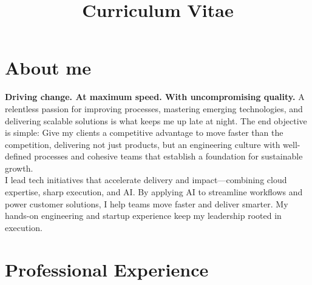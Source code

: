 \documentclass[11pt,a4paper,sans]{moderncv}        %
\title{Curriculum Vitae}                               %
\begin{document}
\makecvtitle

\section{About me}

\textbf{Driving change. At maximum speed. With uncompromising quality.}  A relentless passion for improving processes, mastering emerging technologies, and delivering scalable solutions is what keeps me up late at night. The end objective is simple: Give my clients a competitive advantage to move faster than the competition, delivering not just products, but an engineering culture with well-defined processes and cohesive teams that establish a foundation for sustainable growth. \\

I lead tech initiatives that accelerate delivery and impact—combining cloud expertise, sharp execution, and AI. By applying AI to streamline workflows and power customer solutions, I help teams move faster and deliver smarter. My hands-on engineering and startup experience keep my leadership rooted in execution.

\nopagebreak[4]

\section{Professional Experience}


\end{document}
